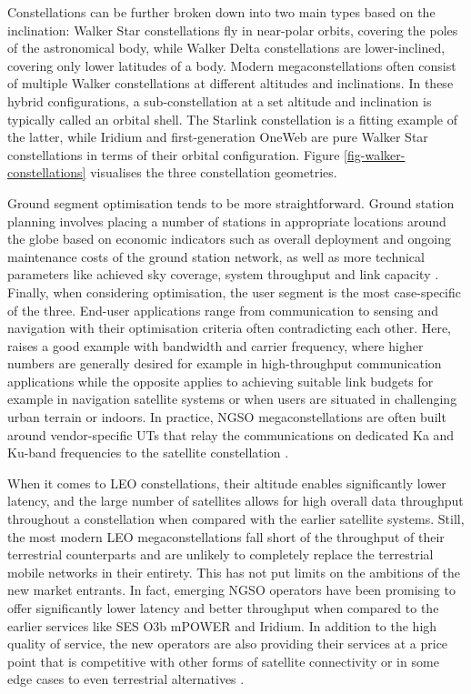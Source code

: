 \documentclass[english, 12pt, a4paper, elec, utf8, a-1b, online]{aaltothesis}
\begin{document}
Constellations can be further broken down into two main types based on the inclination: Walker Star constellations fly in near-polar orbits, covering the poles of the astronomical body, while Walker Delta constellations are lower-inclined, covering only lower latitudes of a body.
Modern megaconstellations often consist of multiple Walker constellations at different altitudes and inclinations. In these hybrid configurations, a sub-constellation at a set altitude and inclination is typically called an orbital shell.
The Starlink constellation is a fitting example of the latter, while Iridium and first-generation OneWeb are pure Walker Star constellations in terms of their orbital configuration.
Figure \ref{fig-walker-constellations} visualises the three constellation geometries.

Ground segment optimisation tends to be more straightforward.
Ground station planning involves placing a number of stations in appropriate locations around the globe based on economic indicators such as overall deployment and ongoing maintenance costs of the ground station network, as well as more technical parameters like achieved sky coverage, system throughput and link capacity \cite{celikbilek2022survey}.
Finally, when considering optimisation, the user segment is the most case-specific of the three.
End-user applications range from communication to sensing and navigation with their optimisation criteria often contradicting each other.
Here, \cite{celikbilek2022survey} raises a good example with bandwidth and carrier frequency, where higher numbers are generally desired for example in high-throughput communication applications while the opposite applies to achieving suitable link budgets for example in navigation satellite systems or when users are situated in challenging urban terrain or indoors.
In practice, NGSO megaconstellations are often built around vendor-specific UTs that relay the communications on dedicated Ka and Ku-band frequencies to the satellite constellation \cite{euspa-secure-satcom-2023}.

When it comes to LEO constellations, their altitude enables significantly lower latency, and the large number of satellites allows for high overall data throughput throughout a constellation when compared with the earlier satellite systems.
Still, the most modern LEO megaconstellations fall short of the throughput of their terrestrial counterparts and are unlikely to completely replace the terrestrial mobile networks in their entirety.
This has not put limits on the ambitions of the new market entrants. In fact, emerging NGSO operators have been promising to offer significantly lower latency and better throughput when compared to the earlier services like SES O3b mPOWER and Iridium. In addition to the high quality of service, the new operators are also providing their services at a price point that is competitive with other forms of satellite connectivity or in some edge cases to even terrestrial alternatives \cite{euspa-secure-satcom-2023}.
\end{document}
